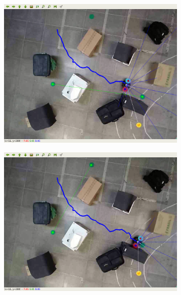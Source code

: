 \begin{figure}[htbp]
\begin{subfigure}[b]{0.115\textwidth}
        \includegraphics[width=\textwidth]{images/test_env2/5.png}
    \end{subfigure}
    \hfill
    \begin{subfigure}[b]{0.115\textwidth}
        \includegraphics[width=\textwidth]{images/test_env2/6.png}
    \end{subfigure}
    \hfill
    \begin{subfigure}[b]{0.115\textwidth}

\end{subfigure}
\end{figure}
